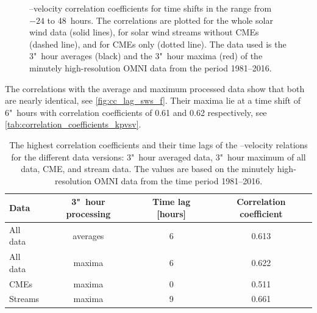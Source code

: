 \begin{figure}[htb]
\begin{floatrow}
{		}{
			\caption[I created the figure myself.]
			{\Kp{}--velocity correlation coefficients for time shifts in the range from $-24$ to 48~hours. The correlations are plotted for the whole solar wind data (solid lines), for solar wind streams without CMEs (dashed line), and for CMEs only (dotted line). The data used is the 3"~hour averages (black) and the 3"~hour maxima (red) of the minutely high-resolution OMNI data from the period 1981--2016.}
			\label{fig:cc_lag_sws_f}
		}
	\end{floatrow}
\end{figure}

The \Kp{} correlations with the average and maximum processed data show that both are nearly identical, see \autoref{fig:cc_lag_sws_f}. Their maxima lie at a time shift of 6"~hours with correlation coefficients of 0.61 and 0.62 respectively, see \autoref{tab:correlation_coefficients_kpvsv}.
\begin{table}
	\caption{The highest correlation coefficients and their time lags of the \Kp{}--velocity relations for the different data versions: 3"~hour averaged data, 3"~hour maximum of all data, CME, and stream data. The values are based on the minutely high-resolution OMNI data from the time period 1981--2016.}
	\label{tab:correlation_coefficients_kpvsv}
	\centering
	\begin{tabular}{lccc}
		\hline\hline
		Data	&3"~hour processing	&Time lag [hours]	&Correlation coefficient\\
		\hline
		All data	&averages	&6	&0.613\\
		All data	&maxima	&6	&0.622\\
		CMEs	&maxima	&0	&0.511\\
		Streams	&maxima	&9	&0.661\\
		\hline
	\end{tabular}
\end{table}
% 

